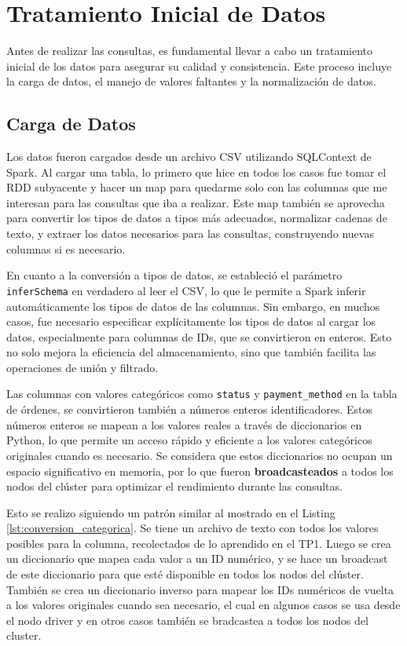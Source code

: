 \section{Tratamiento Inicial de Datos}
\label{sec:tratamiento_inicial_de_datos}

Antes de realizar las consultas, es fundamental llevar a cabo un tratamiento inicial de los datos para asegurar su calidad y consistencia. Este proceso incluye la carga de datos, el manejo de valores faltantes y la normalización de datos.

\subsection{Carga de Datos}

Los datos fueron cargados desde un archivo CSV utilizando SQLContext de Spark. Al cargar una tabla, lo primero que hice en todos los casos fue tomar el RDD subyacente y hacer un map para quedarme solo con las columnas que me interesan para las consultas que iba a realizar. Este map también se aprovecha para convertir los tipos de datos a tipos más adecuados, normalizar cadenas de texto, y extraer los datos necesarios para las consultas, construyendo nuevas columnas si es necesario.

En cuanto a la conversión a tipos de datos, se estableció el parámetro \texttt{inferSchema} en verdadero al leer el CSV, lo que le permite a Spark inferir automáticamente los tipos de datos de las columnas. Sin embargo, en muchos casos, fue necesario especificar explícitamente los tipos de datos al cargar los datos, especialmente para columnas de IDs, que se convirtieron en enteros. Esto no solo mejora la eficiencia del almacenamiento, sino que también facilita las operaciones de unión y filtrado. 

Las columnas con valores categóricos como \texttt{status} y \texttt{payment\_method} en la tabla de órdenes, se convirtieron también a números enteros identificadores. Estos números enteros se mapean a los valores reales a través de diccionarios en Python, lo que permite un acceso rápido y eficiente a los valores categóricos originales cuando es necesario. Se considera que estos diccionarios no ocupan un espacio significativo en memoria, por lo que fueron \textbf{broadcasteados} a todos los nodos del clúster para optimizar el rendimiento durante las consultas. 

Esto se realizo siguiendo un patrón similar al mostrado en el Listing \ref{lst:conversion_categorica}. Se tiene un archivo de texto con todos los valores posibles para la columna, recolectados de lo aprendido en el TP1. Luego se crea un diccionario que mapea cada valor a un ID numérico, y se hace un broadcast de este diccionario para que esté disponible en todos los nodos del clúster. También se crea un diccionario inverso para mapear los IDs numéricos de vuelta a los valores originales cuando sea necesario, el cual en algunos casos se usa desde el nodo driver y en otros casos también se bradcastea a todos los nodos del cluster.

